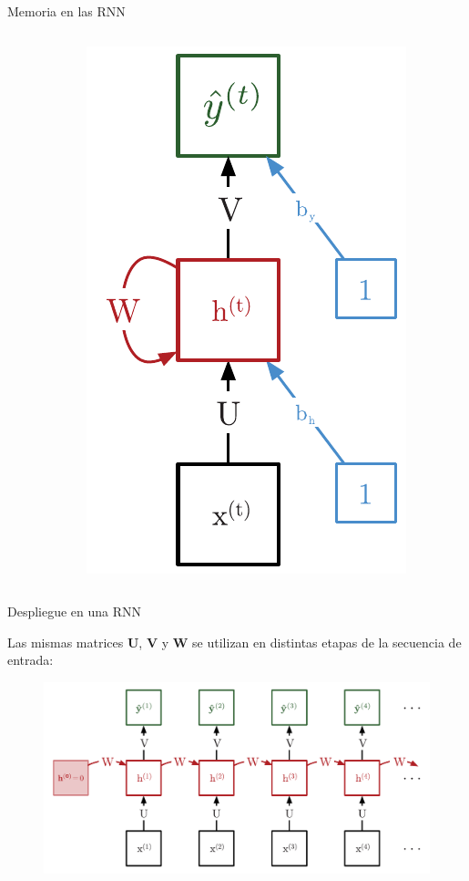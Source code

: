 \documentclass[aspectratio=169]{beamer}
\begin{document}
\begin{frame}[shrink=25]{Memoria en las RNN}
\begin{columns}
\begin{column}{0.6\textwidth}
		\end{column}

		\begin{column}{0.4\textwidth}
			\includegraphics[width=.4\textwidth, right]{imgs/tema4/rnn/MiniModel.pdf}
		\end{column}
	\end{columns}

\end{frame}


\begin{frame}{Despliegue en una RNN}

	Las mismas matrices $\mathbf{U}$, $\mathbf{V}$ y $\mathbf{W}$ se utilizan en distintas etapas de la secuencia de entrada:\\
	\vspace{1em}
	\begin{figure}
		\includegraphics[width=.7\textwidth, center]{imgs/tema4/rnn/DESP1.pdf}
		\label{key}
	\end{figure}

\end{frame}
\end{document}
